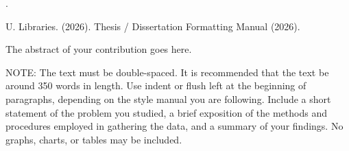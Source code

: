 {.



U. Libraries. (2026). Thesis / Dissertation Formatting Manual (2026).





}

\thesisabstract
{
  The abstract of your contribution goes here.

  NOTE: The text must be double-spaced. It is recommended that the text be around 350 words in length. Use indent or flush left at the beginning of paragraphs, depending on the style manual you are following. Include a short statement of the problem you studied, a brief exposition of the methods and procedures employed in gathering the data, and a summary of your findings. No graphs, charts, or tables may be included.
}


